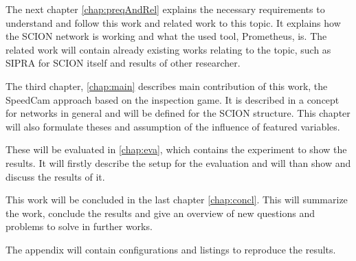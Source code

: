\documentclass[thesis.tex]{subfiles}
\begin{document}
The next chapter \autoref{chap:preqAndRel} explains the necessary requirements to understand and follow this work and related work to this topic. It explains how the SCION network is working and what the used tool, Prometheus, is. The related work will contain already existing works relating to the topic, such as SIPRA for SCION itself and results of other researcher. 

The third chapter, \autoref{chap:main} describes main contribution of this work, the SpeedCam approach based on the inspection game. It is described in a concept for networks in general and will be defined for the SCION structure. This chapter will also formulate theses and assumption of the influence of featured variables.

These will be evaluated in \autoref{chap:eva}, which contains the experiment to show the results. It will firstly describe the setup for the evaluation and will than show and discuss the results of it.

This work will be concluded in the last chapter \autoref{chap:concl}. This will summarize the work, conclude the results and give an overview of new questions and problems to solve in further works.

The appendix will contain configurations and listings to reproduce the results.

\subfilebib %
\end{document}
